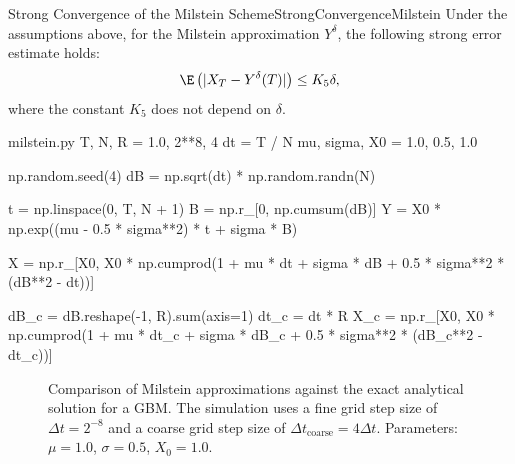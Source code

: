 \begin{thm}{Strong Convergence of the Milstein Scheme}{StrongConvergenceMilstein}
    Under the assumptions above, for the Milstein approximation $Y^\delta$, the following strong error estimate holds:
    \begin{equation}
        \E \left(|X_T - Y^\delta(T)|\right) \leq K_5 \delta, \label{eq:MilsteinConvergenceBound}
    \end{equation}
    where the constant $K_5$ does not depend on $\delta$.
\end{thm}

\begin{Pcode}{milstein.py}
    T, N, R = 1.0, 2**8, 4
    dt = T / N
    mu, sigma, X0 = 1.0, 0.5, 1.0

    np.random.seed(4)
    dB = np.sqrt(dt) * np.random.randn(N)

    t = np.linspace(0, T, N + 1)
    B = np.r_[0, np.cumsum(dB)]
    Y = X0 * np.exp((mu - 0.5 * sigma**2) * t + sigma * B)

    X = np.r_[X0, X0 * np.cumprod(1 + mu * dt + sigma * dB + 0.5 * sigma**2 * (dB**2 - dt))]

    dB_c = dB.reshape(-1, R).sum(axis=1)
    dt_c = dt * R
    X_c = np.r_[X0, X0 * np.cumprod(1 + mu * dt_c + sigma * dB_c + 0.5 * sigma**2 * (dB_c**2 - dt_c))]
\end{Pcode}

\begin{figure}[H]
    \centering
    
    \caption{Comparison of Milstein approximations against the exact analytical solution for a GBM. The simulation uses a fine grid step size of $\Delta t = 2^{-8}$ and a coarse grid step size of $\Delta t_{\text{coarse}} = 4\Delta t$. Parameters: $\mu=1.0$, $\sigma=0.5$, $X_0=1.0$.}
    \label{fig:milsteinCoarseFineComparison}
\end{figure}